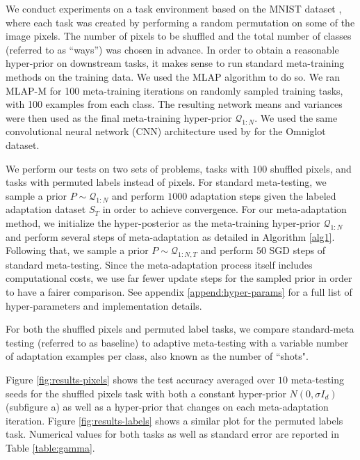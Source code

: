 \documentclass{article} %
\theoremstyle{definition}
\begin{document}
We conduct experiments on a task environment based on the MNIST dataset \citep{LeCun1998}, where each task was created by performing a random permutation on some of the image pixels. The number of pixels to be shuffled and the total number of classes (referred to as ``ways'') was chosen in advance. In order to obtain a reasonable hyper-prior on downstream tasks, it makes sense to run standard meta-training methods on the training data.
We used the MLAP \citep{Amit2018} algorithm to do so. We ran MLAP-M for 100 meta-training iterations on randomly sampled training tasks, with 100 examples from each class. The resulting network means and variances were then used as the final meta-training hyper-prior $\mathcal{Q}_{1:N}$. We used the same convolutional neural network (CNN) architecture used by \citet{Vinyals2016} for the Omniglot dataset.

We perform our tests on two sets of problems, tasks with $100$ shuffled pixels, and tasks with permuted labels instead of pixels.
For standard meta-testing, we sample a prior $P\sim \mathcal{Q}_{1:N}$ and perform $1000$ adaptation steps given the labeled adaptation dataset $S_T$ in order to achieve convergence. For our meta-adaptation method, we initialize the hyper-posterior as the meta-training hyper-prior $\mathcal{Q}_{1:N}$ and
 perform several steps of meta-adaptation as detailed in Algorithm \ref{alg1}. Following that, we sample a prior $P\sim \mathcal{Q}_{1:N,T}$ and perform  $50$ SGD steps of standard meta-testing. Since the meta-adaptation process itself includes computational costs, we use far fewer update steps for the sampled prior in order to have a fairer comparison.
See appendix \ref{append:hyper-params} for a full list of hyper-parameters and implementation details.

For both the shuffled pixels and permuted label tasks, we compare standard-meta testing (referred to as baseline) to adaptive meta-testing with a variable number of adaptation examples per class, also known as the number of ``shots".

Figure \ref{fig:results-pixels} shows the test accuracy averaged over $10$ meta-testing seeds for the shuffled pixels task with both a constant hyper-prior $N(0,\sigma I_d)$ (subfigure a) as well as a hyper-prior that changes on each meta-adaptation iteration. Figure \ref{fig:results-labels} shows a similar plot for the permuted labels task. 
Numerical values for both tasks as well as standard error are reported in Table \ref{table:gamma}.
\end{document}
